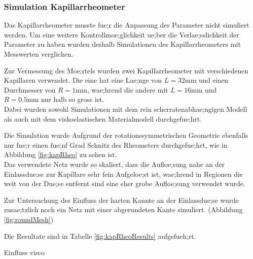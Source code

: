 \subsubsection{Simulation Kapillarrheometer}
Das Kapillarrheometer musste fue;r die Anpassung der Parameter nicht simuliert werden. Um eine weitere Kontrollmoe;glichkeit ue;ber die Verlae;sslichkeit der Parameter zu haben wurden deshalb Simulationen des Kapillarrheometers mit Messwerten verglichen.

Zur Vermessung des Moe;rtels wurden zwei Kapillarrheometer mit verschiedenen Kapillaren verwendet. Die eine hat eine Lae;nge von $L=32\mbox{mm}$ und einen Durchmesser von $R=1\mbox{mm}$, wae;hrend die andere mit $L=16\mbox{mm}$ und $R=0.5\mbox{mm}$ nur halb so gross ist.\\
Dabei wurden sowohl Simulationen mit dem rein scherratenabhae;ngigen Modell als auch mit dem viskoelastischen Materialmodell durchgefue;hrt.

Die Simulation wurde Aufgrund der rotationssymmetrischen Geometrie ebenfalls nur fue;r einen fue;nf Grad Schnitz  des Rheometers durchgefue;hrt, wie in Abbildung \ref{fig:kapRheo}  zu sehen ist.\\
Das verwendete Netz wurde so skaliert, dass die Aufloe;sung nahe an der Einlassdue;se zur Kapillare sehr fein Aufgeloe;st ist, wae;hrend in Regionen die weit von der Due;se entfernt sind eine eher grobe Aufloe;sung verwendet wurde.

Zur Untersuchung des Einfluss der harten Kannte an der Einlassdue;se wurde zusae;tzlich noch ein Netz mit einer abgerundeten Kante simuliert. (Abbildung \ref{fig:roundMesh})  

Die Resultate sind in Tabelle \ref{fig:kapRheoResults} aufgefueh;rt.

\begin{todocontent}
    \1 Einfluss visco
\end{todocontent}
%
